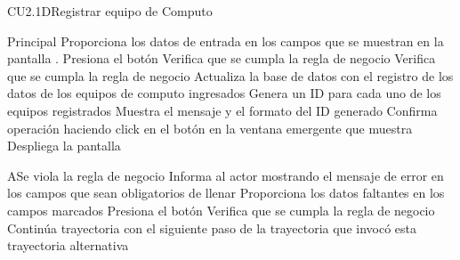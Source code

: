 \begin{UseCase}{CU2.1D}{Registrar equipo de Computo}
{		}
\end{UseCase}


\begin{UCtrayectoria}{Principal}
		\UCpaso[\UCactor] Proporciona los datos de entrada  en los campos que se muestran en la pantalla .
		\UCpaso[\UCactor] Presiona el botón  
		\UCpaso[\UCsist] Verifica que se cumpla la regla de negocio  
		\UCpaso[\UCsist] Verifica que se cumpla la regla de negocio  
		\UCpaso[\UCsist] Actualiza la base de datos con el registro de los datos de los equipos de computo ingresados 
		\UCpaso[\UCsist] Genera un ID para cada uno de los equipos registrados
		\UCpaso[\UCsist] Muestra el mensaje  y el formato del ID generado
		\UCpaso[\UCactor] Confirma operación haciendo click en el botón  en la ventana emergente que muestra
		\UCpaso[\UCsist] Despliega la pantalla 
\end{UCtrayectoria}



\begin{UCtrayectoriaA}{A}{Se viola la regla de negocio }	
			\UCpaso[\UCsist] Informa al actor mostrando el mensaje de error  en los campos que sean obligatorios de llenar
			\UCpaso[\UCactor] Proporciona los datos faltantes en los campos marcados 
			\UCpaso[\UCactor] Presiona el botón   
			\UCpaso[\UCsist] Verifica que se cumpla la regla de negocio  
			\UCpaso[\UCsist] Continúa trayectoria con el siguiente paso de la trayectoria que invocó esta trayectoria alternativa
\end{UCtrayectoriaA}

